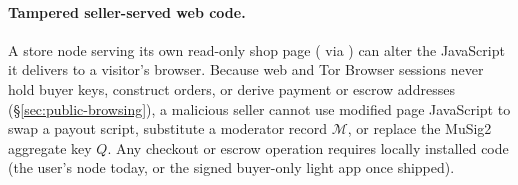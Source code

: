 \paragraph{Tampered seller-served web code.} A store node serving its own read-only shop page ( via ) can alter the JavaScript it delivers to a visitor's browser. Because web and Tor Browser sessions never hold buyer keys, construct orders, or derive payment or escrow addresses (\S\ref{sec:public-browsing}), a malicious seller cannot use modified page JavaScript to swap a payout script, substitute a moderator record $\mathcal{M}$, or replace the MuSig2 aggregate key $Q$. Any checkout or escrow operation requires locally installed code (the user's node today, or the signed buyer-only light app once shipped).
